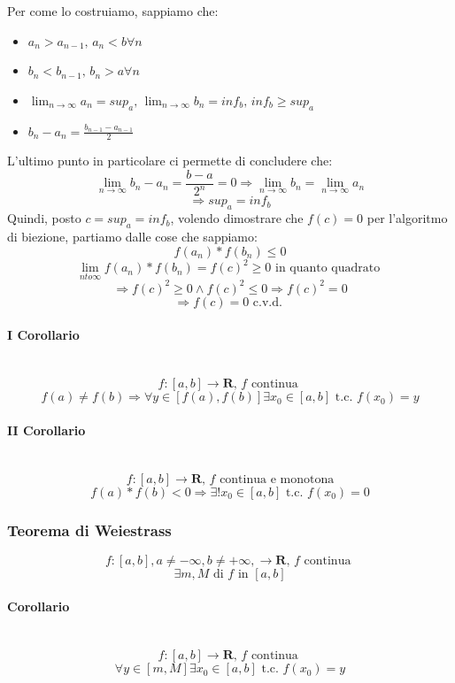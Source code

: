 \documentclass{report}
\newcommand{\subsubsubsection}[1]{\paragraph{#1}\mbox{}\\}
\begin{document}
                Per come lo costruiamo, sappiamo che:
                \begin{itemize}
                    \item $a_{n} > a_{n-1}, \, a_n < b \forall n$
                    \item $b_{n} < b_{n-1}, \, b_n > a \forall n$
                    \item $\lim_{n \to \infty} a_n = sup_a, \, \lim_{n \to \infty} b_n = inf_b, \, inf_b \geq sup_a$
                    \item $b_{n} - a_{n} = \frac{b_{n-1} - a_{n-1}}{2}$
                \end{itemize}
                L'ultimo punto in particolare ci permette di concludere che:
                $$\lim_{n \to \infty} b_n - a_n = \frac{b - a}{2^n} = 0 \Longrightarrow \lim_{n \to \infty} b_n = \lim_{n \to \infty} a_n$$
                $$\Longrightarrow sup_a = inf_b$$
                Quindi, posto $c = sup_a = inf_b$, volendo dimostrare che $f\left(c\right) = 0$ per l'algoritmo di biezione, 
                partiamo dalle cose che sappiamo:
                $$f\left(a_n\right) * f\left(b_n\right) \leq 0$$
                $$\lim_{n to \infty} f\left(a_n\right) * f\left(b_n\right) = f\left(c\right)^2 \geq 0 \textrm { in quanto quadrato }$$
                $$\Longrightarrow f\left(c\right)^2 \geq 0 \wedge f\left(c\right)^2 \leq 0 \Longrightarrow f\left(c\right)^2 = 0$$
                $$\Longrightarrow f\left(c\right) = 0 \textrm{ c.v.d. }$$
            \subsubsubsection{I Corollario}
                $$f:\left[a, b\right] \longrightarrow \mathbf{R}, \, f \textrm{ continua }$$
                $$f\left(a\right) \neq f\left(b\right) \Longrightarrow \forall y \in 
                    \left[f\left(a\right), f\left(b\right)\right] \exists x_0 \in \left[a, b\right] 
                    \textrm{ t.c. } f\left(x_0\right) = y$$
            \subsubsubsection{II Corollario}
                $$f: \left[a, b\right] \longrightarrow \mathbf{R}, \, f \textrm{ continua e monotona}$$
                $$f\left(a\right) * f\left(b\right) < 0 \Longrightarrow 
                    \exists! x_0 \in \left[a, b\right] \textrm{ t.c. } f\left(x_0\right) = 0$$
        \subsubsection{Teorema di Weiestrass}
            $$f: \left[a, b\right], a \neq -\infty, b \neq +\infty, \longrightarrow \mathbf{R}, \, f \textrm{ continua }$$
            $$\exists m, M \textrm{ di } f \textrm{ in } \left[a, b\right]$$
            \subsubsubsection{Corollario}
                $$f: \left[a, b\right] \longrightarrow \mathbf{R}, \, f \textrm{ continua }$$
                $$\forall y \in \left[m, M\right] \exists x_0 \in \left[a, b\right] 
                    \textrm{ t.c. } f\left(x_0\right) = y$$
\end{document}
